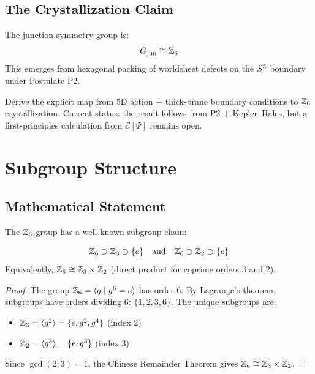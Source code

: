 \subsection{The Crystallization Claim}

\begin{resultbox}[title=Crystallization Result]
    The junction symmetry group is:
    \begin{equation}
        G_{\text{jun}} \cong \mathbb{Z}_6
        \label{eq:Gjun_Z6}
    \end{equation}
    This emerges from hexagonal packing of worldsheet defects on the
    $\Sfive$ boundary under Postulate P2. \tagDc
\end{resultbox}

\begin{edcopenbox}[title=OPEN: Explicit $\Sfive$ Derivation]
    Derive the explicit map from 5D action + thick-brane boundary conditions
    to $\mathbb{Z}_6$ crystallization. Current status: the result follows from P2 +
    Kepler--Hales, but a first-principles calculation from $\mathcal{E}[\Psi]$
    remains open. \tagOpen
\end{edcopenbox}

\section{Subgroup Structure}
\label{sec:junction:subgroups}

\subsection{Mathematical Statement}

The $\mathbb{Z}_6$ group has a well-known subgroup chain:

\begin{derivationbox}[title=Subgroup Chain]
    \begin{equation}
        \mathbb{Z}_6 \supset \mathbb{Z}_3 \supset \{e\}
        \quad\text{and}\quad
        \mathbb{Z}_6 \supset \mathbb{Z}_2 \supset \{e\}
        \label{eq:subgroup_chain}
    \end{equation}
    Equivalently, $\mathbb{Z}_6 \cong \mathbb{Z}_3 \times \mathbb{Z}_2$ (direct product for
    coprime orders 3 and 2). \tagDer
\end{derivationbox}

\begin{proof}
The group $\mathbb{Z}_6 = \langle g \mid g^6 = e \rangle$ has order 6. By Lagrange's
theorem, subgroups have orders dividing 6: $\{1, 2, 3, 6\}$. The unique
subgroups are:
\begin{itemize}
    \item $\mathbb{Z}_3 = \langle g^2 \rangle = \{e, g^2, g^4\}$ (index 2)
    \item $\mathbb{Z}_2 = \langle g^3 \rangle = \{e, g^3\}$ (index 3)
\end{itemize}
Since $\gcd(2,3) = 1$, the Chinese Remainder Theorem gives
$\mathbb{Z}_6 \cong \mathbb{Z}_3 \times \mathbb{Z}_2$.
\end{proof}

